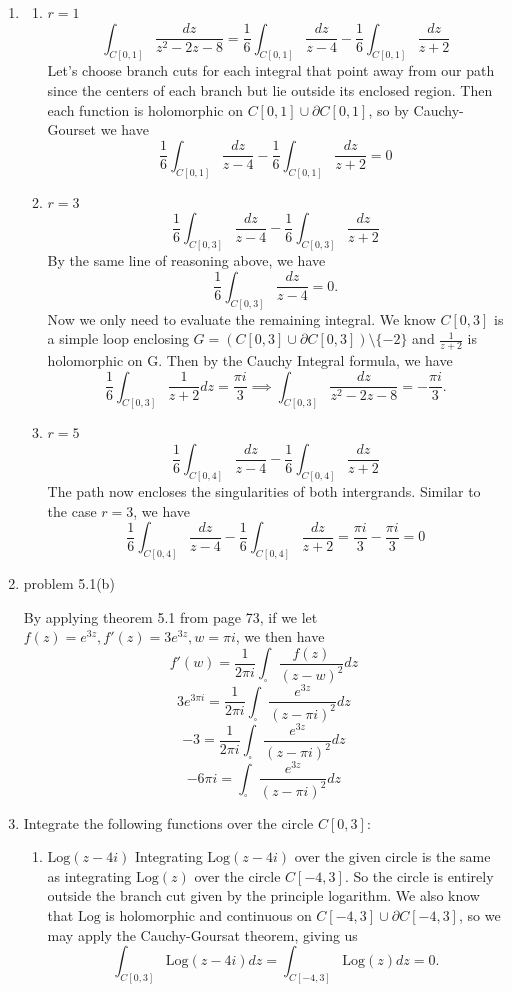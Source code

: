 \documentclass{article}
\newcommand{\Log}{\text{Log}}
\begin{document}
\begin{enumerate}
	\item 
	\begin{enumerate}
		\item $r = 1$
		\[\int_{C[0,1]}\frac{dz}{z^2-2z-8}=\frac{1}{6}\int_{C[0,1]}\frac{dz}{z-4}-\frac{1}{6}\int_{C[0,1]}\frac{dz}{z+2} \]
		Let's choose branch cuts for each integral that point away from our path since the centers of each branch but lie outside its enclosed region. Then each function is holomorphic on $C[0,1]\cup\partial C[0,1]$, so by Cauchy-Gourset we have
		\[\frac{1}{6}\int_{C[0,1]}\frac{dz}{z-4}-\frac{1}{6}\int_{C[0,1]}\frac{dz}{z+2} =0 \]
		
		\item $r=3$
		\[\frac{1}{6}\int_{C[0,3]}\frac{dz}{z-4}-\frac{1}{6}\int_{C[0,3]}\frac{dz}{z+2} \]
		By the same line of reasoning above, we have
		\[\frac{1}{6}\int_{C[0,3]}\frac{dz}{z-4}=0. \]
		Now we only need to evaluate the remaining integral. We know $C[0,3]$ is a simple loop enclosing $G = (C[0,3]\cup\partial C[0,3])\setminus\{-2\}$ and $\frac{1}{z+2}$ is holomorphic on G. Then by the Cauchy Integral formula, we have
		\[\frac{1}{6}\int_{C[0,3]}\frac{1}{z+2}dz=\frac{\pi i}{3}\implies \int_{C[0,3]}\frac{dz}{z^2-2z-8}=-\frac{\pi i}{3}.\]
		
		\item $r=5$
		\[\frac{1}{6}\int_{C[0,4]}\frac{dz}{z-4}-\frac{1}{6}\int_{C[0,4]}\frac{dz}{z+2} \]
		The path now encloses the singularities of both intergrands. Similar to the case $r = 3$, we have
		\[ \frac{1}{6}\int_{C[0,4]}\frac{dz}{z-4}-\frac{1}{6}\int_{C[0,4]}\frac{dz}{z+2}=\frac{\pi i}{3}-\frac{\pi i}{3}=0\]
	\end{enumerate}
	
	\item problem 5.1(b)
	
	By applying theorem 5.1 from page 73, if we let $f(z)=e^{3z}, f'(z)=3e^{3z}, w=\pi i$, we then have
	\[f'(w)=\frac{1}{2\pi i}\int_{\square}\frac{f(z)}{(z-w)^2}dz \]
	\[3e^{3\pi i}=\frac{1}{2\pi i}\int_{\square}\frac{e^{3z}}{(z-\pi i)^2}dz \]
	\[-3=\frac{1}{2\pi i}\int_{\square}\frac{e^{3z}}{(z-\pi i)^2}dz \]
	\[-6\pi i=\int_{\square}\frac{e^{3z}}{(z-\pi i)^2}dz \]
	
	\item Integrate the following functions over the circle $C[0,3]$:
	\begin{enumerate}
		\item $\Log(z-4i)$
		Integrating $\Log(z-4i)$ over the given circle is the same as integrating $\Log(z)$ over the circle $C[-4,3]$. So the circle is entirely outside the branch cut given by the principle logarithm. We also know that $\Log$ is holomorphic and continuous on $C[-4,3]\cup\partial C[-4,3]$, so we may apply the Cauchy-Goursat theorem, giving us
		\[\int_{C[0,3]}\Log(z-4i)dz=\int_{C[-4,3]}\Log(z)dz=0. \]
		

\end{enumerate}
\end{enumerate}
\end{document}
